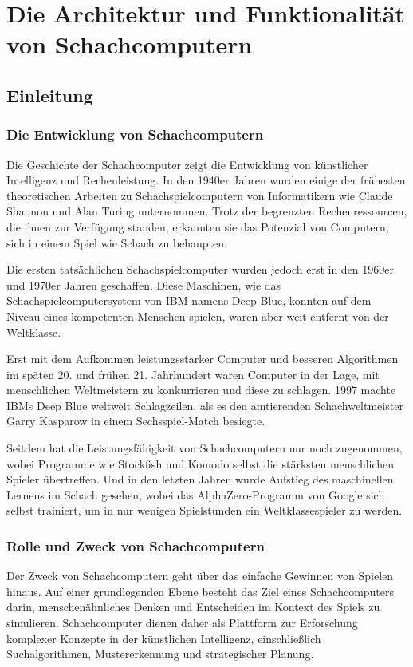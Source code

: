 
\chapter{Die Architektur und Funktionalität von Schachcomputern}

\section{Einleitung}

\subsection{Die Entwicklung von Schachcomputern}
Die Geschichte der Schachcomputer zeigt die Entwicklung von künstlicher Intelligenz und Rechenleistung. 
In den 1940er Jahren wurden einige der frühesten theoretischen Arbeiten zu Schachspielcomputern von Informatikern 
wie Claude Shannon und Alan Turing unternommen. Trotz der begrenzten Rechenressourcen, die ihnen zur Verfügung standen, 
erkannten sie das Potenzial von Computern, sich in einem Spiel wie Schach zu behaupten.~\cite{History_of_chess_engines_2023_wikipedia}

Die ersten tatsächlichen Schachspielcomputer wurden jedoch erst in den 1960er und 1970er Jahren geschaffen. Diese Maschinen, 
wie das Schachspielcomputersystem von IBM namens Deep Blue, konnten auf dem Niveau eines kompetenten Menschen spielen, 
waren aber weit entfernt von der Weltklasse.

Erst mit dem Aufkommen leistungsstarker Computer und besseren Algorithmen im späten 20. und frühen 21. Jahrhundert 
waren Computer in der Lage, mit menschlichen Weltmeistern zu konkurrieren und diese zu schlagen. 
1997 machte IBMs Deep Blue weltweit Schlagzeilen, als es den amtierenden Schachweltmeister Garry Kasparow in einem Sechsspiel-Match besiegte.~\cite{Chris_Higgins_2017_mentalfloss}


Seitdem hat die Leistungsfähigkeit von Schachcomputern nur noch zugenommen, wobei Programme wie Stockfish und Komodo selbst die stärksten 
menschlichen Spieler übertreffen. Und in den letzten Jahren wurde Aufstieg des maschinellen Lernens im Schach gesehen, 
wobei das AlphaZero-Programm von Google sich selbst trainiert, um in nur wenigen Spielstunden ein Weltklassespieler zu werden.~\cite{History_of_chess_engines_2023_wikipedia}

\subsection{Rolle und Zweck von Schachcomputern}
Der Zweck von Schachcomputern geht über das einfache Gewinnen von Spielen hinaus. Auf einer grundlegenden Ebene besteht das Ziel eines Schachcomputers darin, 
menschenähnliches Denken und Entscheiden im Kontext des Spiels zu simulieren. Schachcomputer dienen daher als Plattform zur Erforschung komplexer Konzepte 
in der künstlichen Intelligenz, einschließlich Suchalgorithmen, Mustererkennung und strategischer Planung.

